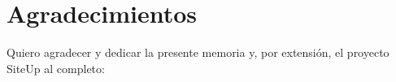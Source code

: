 \section*{Agradecimientos}
Quiero agradecer y dedicar la presente memoria y, por extensión, el proyecto
SiteUp al completo:

